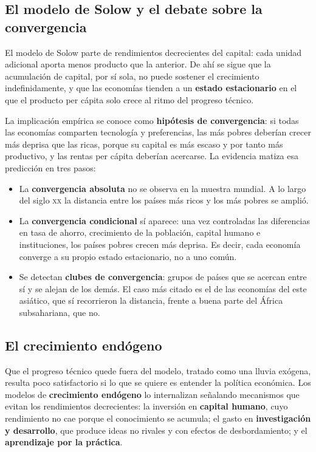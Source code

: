 \subsection{El modelo de Solow y el debate sobre la convergencia}

El modelo de Solow parte de rendimientos decrecientes del capital: cada unidad
adicional aporta menos producto que la anterior. De ahí se sigue que la
acumulación de capital, por sí sola, no puede sostener el crecimiento
indefinidamente, y que las economías tienden a un \textbf{estado estacionario}
en el que el producto per cápita solo crece al ritmo del progreso técnico.

La implicación empírica se conoce como \textbf{hipótesis de convergencia}: si
todas las economías comparten tecnología y preferencias, las más pobres deberían
crecer más deprisa que las ricas, porque su capital es más escaso y por tanto
más productivo, y las rentas per cápita deberían acercarse. La evidencia matiza
esa predicción en tres pasos:

\begin{itemize}
    \item La \textbf{convergencia absoluta} no se observa en la muestra mundial.
    A lo largo del siglo \textsc{xx} la distancia entre los países más ricos y
    los más pobres se amplió.
    \item La \textbf{convergencia condicional} sí aparece: una vez controladas
    las diferencias en tasa de ahorro, crecimiento de la población, capital
    humano e instituciones, los países pobres crecen más deprisa. Es decir,
    cada economía converge a su propio estado estacionario, no a uno común.
    \item Se detectan \textbf{clubes de convergencia}: grupos de países que se
    acercan entre sí y se alejan de los demás. El caso más citado es el de las
    economías del este asiático, que sí recorrieron la distancia, frente a buena
    parte del África subsahariana, que no.
\end{itemize}

\subsection{El crecimiento endógeno}

Que el progreso técnico quede fuera del modelo, tratado como una lluvia
exógena, resulta poco satisfactorio si lo que se quiere es entender la política
económica. Los modelos de \textbf{crecimiento endógeno} lo internalizan
señalando mecanismos que evitan los rendimientos decrecientes: la inversión en
\textbf{capital humano}, cuyo rendimiento no cae porque el conocimiento se
acumula; el gasto en \textbf{investigación y desarrollo}, que produce ideas no
rivales y con efectos de desbordamiento; y el \textbf{aprendizaje por la
práctica}.

